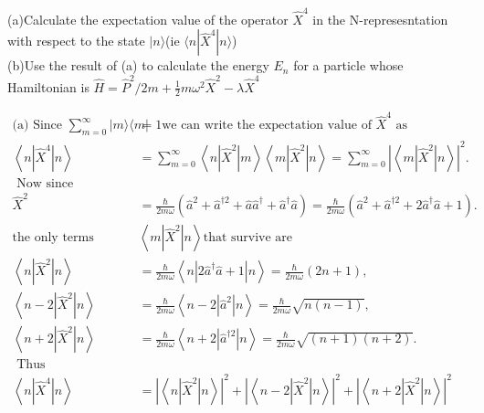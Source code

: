 \begin{exercise}
	(a)Calculate the expectation value of the operator $\hat{X}^4$ in the N-represesntation with respect to the state $|n\rangle$(ie $\langle n|\hat{X}^4 |n\rangle$)\\
	(b)Use the result of (a) to calculate the energy $E_n$ for a particle whose Hamiltonian is $\hat{H}=\hat{P}^2/2m+\frac{1}{2}m\omega^2\hat{X}^2-\lambda\hat{X}^4$
\end{exercise}
\begin{answer}
	\begin{align*}
		\text{(a) Since }\sum_{m=0}^{\infty}|m\rangle\langle m|&=1 \text{we can write the expectation value of $\hat{X}^{4}$ as}\\
	\left\langle n\left|\hat{X}^{4}\right| n\right\rangle&=\sum_{m=0}^{\infty}\left\langle n\left|\hat{X}^{2}\right| m\right\rangle\left\langle m\left|\hat{X}^{2}\right| n\right\rangle=\sum_{m=0}^{\infty}\left|\left\langle m\left|\hat{X}^{2}\right| n\right\rangle\right|^{2} .\\
\text{	Now since }\\
	\hat{X}^{2}&=\frac{\hbar}{2 m \omega}\left(\hat{a}^{2}+\hat{a}^{\dagger 2}+\hat{a} \hat{a}^{\dagger}+\hat{a}^{\dagger} \hat{a}\right)=\frac{\hbar}{2 m \omega}\left(\hat{a}^{2}+\hat{a}^{\dagger 2}+2 \hat{a}^{\dagger} \hat{a}+1\right) .\\
	\text{the only terms }&\left\langle m\left|\hat{X}^{2}\right| n\right\rangle \text{that survive are}\\
	\left\langle n\left|\hat{X}^{2}\right| n\right\rangle &=\frac{\hbar}{2 m \omega}\left\langle n\left|2 \hat{a}^{\dagger} \hat{a}+1\right| n\right\rangle=\frac{\hbar}{2 m \omega}(2 n+1), \\
	\left\langle n-2\left|\hat{X}^{2}\right| n\right\rangle &=\frac{\hbar}{2 m \omega}\left\langle n-2\left|\hat{a}^{2}\right| n\right\rangle=\frac{\hbar}{2 m \omega} \sqrt{n(n-1)}, \\
	\left\langle n+2\left|\hat{X}^{2}\right| n\right\rangle &=\frac{\hbar}{2 m \omega}\left\langle n+2\left|\hat{a}^{\dagger 2}\right| n\right\rangle=\frac{\hbar}{2 m \omega} \sqrt{(n+1)(n+2)} .\\
\text{	Thus}\\
	\left\langle n\left|\hat{X}^{4}\right| n\right\rangle &=\left|\left\langle n\left|\hat{X}^{2}\right| n\right\rangle\right|^{2}+\left|\left\langle n-2\left|\hat{X}^{2}\right| n\right\rangle\right|^{2}+\left|\left\langle n+2\left|\hat{X}^{2}\right| n\right\rangle\right|^{2} \\

\end{align*}
\end{answer}
